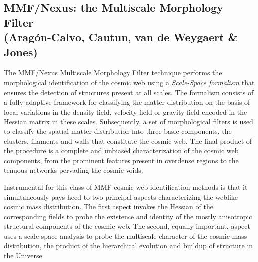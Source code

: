 
\subsection{MMF/Nexus: the Multiscale Morphology Filter \\ \hskip 0.75cm(Arag\'on-Calvo, Cautun, van de Weygaert \& Jones)} 
The MMF/Nexus Multiscale Morphology Filter technique \citep[][]{aragon2007,aragon2010b,cautun2013,cautun2014,aragon2014} performs the morphological 
identification of the cosmic web using a \textit{Scale-Space formalism} that ensures the detection of structures present at all scales. The formalism 
consists of a fully adaptive framework for classifying the matter distribution on the basis of local variations in the density field, velocity 
field or gravity field encoded in the Hessian matrix in these scales. Subsequently, a set of morphological filters is used to classify the spatial 
matter distribution into three basic components, the clusters, filaments and walls that constitute the cosmic web. The final product of the 
procedure is a complete and unbiased characterization of the cosmic web components, from the prominent features present in overdense regions 
to the tenuous networks pervading the cosmic voids.

Instrumental for this class of MMF cosmic web identification methods is that it simultaneously pays heed to two principal 
aspects characterizing the weblike cosmic mass distribution. The first aspect invokes the Hessian of the corresponding 
fields to probe the existence and identity of the mostly anisotropic structural components of the cosmic web. 
The second, equally important, aspect uses a scale-space analysis to probe the multiscale character of the cosmic mass distribution, 
the product of the hierarchical evolution and buildup of structure in the Universe. 

